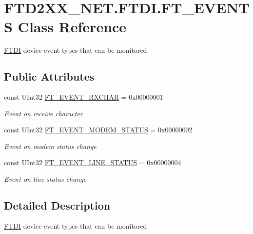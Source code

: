 \hypertarget{class_f_t_d2_x_x___n_e_t_1_1_f_t_d_i_1_1_f_t___e_v_e_n_t_s}{}\section{F\+T\+D2\+X\+X\+\_\+\+N\+E\+T.\+F\+T\+D\+I.\+F\+T\+\_\+\+E\+V\+E\+N\+TS Class Reference}
\label{class_f_t_d2_x_x___n_e_t_1_1_f_t_d_i_1_1_f_t___e_v_e_n_t_s}


\mbox{\hyperlink{class_f_t_d2_x_x___n_e_t_1_1_f_t_d_i}{F\+T\+DI}} device event types that can be monitored  


\subsection*{Public Attributes}
\begin{DoxyCompactItemize}
\item 
const U\+Int32 \mbox{\hyperlink{class_f_t_d2_x_x___n_e_t_1_1_f_t_d_i_1_1_f_t___e_v_e_n_t_s_a6282524a26f82e6e0107af3e6a5357ca}{F\+T\+\_\+\+E\+V\+E\+N\+T\+\_\+\+R\+X\+C\+H\+AR}} = 0x00000001
\begin{DoxyCompactList}\small\item\em Event on receive character \end{DoxyCompactList}\item 
const U\+Int32 \mbox{\hyperlink{class_f_t_d2_x_x___n_e_t_1_1_f_t_d_i_1_1_f_t___e_v_e_n_t_s_abbcc92a6699a93c2fe6aa3c59ac27838}{F\+T\+\_\+\+E\+V\+E\+N\+T\+\_\+\+M\+O\+D\+E\+M\+\_\+\+S\+T\+A\+T\+US}} = 0x00000002
\begin{DoxyCompactList}\small\item\em Event on modem status change \end{DoxyCompactList}\item 
const U\+Int32 \mbox{\hyperlink{class_f_t_d2_x_x___n_e_t_1_1_f_t_d_i_1_1_f_t___e_v_e_n_t_s_ad4458f6b4ac00f4abe4a3a115f574b0e}{F\+T\+\_\+\+E\+V\+E\+N\+T\+\_\+\+L\+I\+N\+E\+\_\+\+S\+T\+A\+T\+US}} = 0x00000004
\begin{DoxyCompactList}\small\item\em Event on line status change \end{DoxyCompactList}\end{DoxyCompactItemize}


\subsection{Detailed Description}
\mbox{\hyperlink{class_f_t_d2_x_x___n_e_t_1_1_f_t_d_i}{F\+T\+DI}} device event types that can be monitored 



